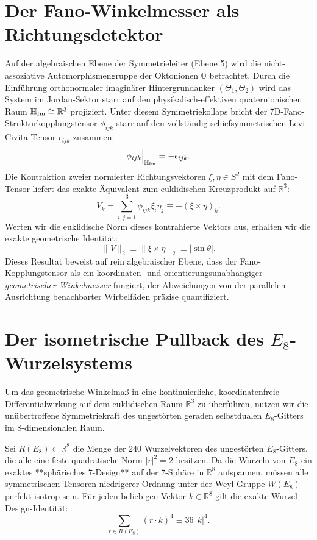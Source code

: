 \documentclass[11pt,twoside,a4paper]{article}
\begin{document}
	\section{Der Fano-Winkelmesser als Richtungsdetektor}
	Auf der algebraischen Ebene der Symmetrieleiter (Ebene 5) wird die nicht-assoziative Automorphismengruppe der Oktonionen $\mathbb{O}$ betrachtet. Durch die Einführung orthonormaler imaginärer Hintergrundanker $(\Theta_1, \Theta_2)$ wird das System im Jordan-Sektor starr auf den physikalisch-effektiven quaternionischen Raum $\mathbb{H}_{\rm Im} \cong \mathbb{R}^3$ projiziert. Unter diesem Symmetriekollaps bricht der 7D-Fano-Strukturkopplungstensor $\phi_{ijk}$ starr auf den vollständig schiefsymmetrischen Levi-Civita-Tensor $\epsilon_{ijk}$ zusammen:
	\begin{equation}
		\phi_{ijk}\Big|_{\mathbb{H}_{\rm Im}} = -\epsilon_{ijk}.
	\end{equation}
	Die Kontraktion zweier normierter Richtungsvektoren $\xi, \eta \in S^2$ mit dem Fano-Tensor liefert das exakte Äquivalent zum euklidischen Kreuzprodukt auf $\mathbb{R}^3$:
	\begin{equation}
		V_k = \sum_{i,j=1}^3 \phi_{ijk} \xi_i \eta_j \equiv -(\xi \times \eta)_k.
	\end{equation}
	Werten wir die euklidische Norm dieses kontrahierte Vektors aus, erhalten wir die exakte geometrische Identität:
	\begin{equation}
		\|V\|_2 \equiv \|\xi \times \eta\|_2 \equiv |\sin \theta|.
	\end{equation}
	Dieses Resultat beweist auf rein algebraischer Ebene, dass der Fano-Kopplungstensor als ein koordinaten- und orientierungsunabhängiger \textit{geometrischer Winkelmesser} fungiert, der Abweichungen von der parallelen Ausrichtung benachbarter Wirbelfäden präzise quantifiziert.
	
	\section{Der isometrische Pullback des $E_8$-Wurzelsystems}
	Um das geometrische Winkelmaß in eine kontinuierliche, koordinatenfreie Differentialwirkung auf dem euklidischen Raum $\mathbb{R}^3$ zu überführen, nutzen wir die unübertroffene Symmetriekraft des ungestörten geraden selbstdualen $E_8$-Gitters im 8-dimensionalen Raum.
	
	Sei $R(E_8) \subset \mathbb{R}^8$ die Menge der $240$ Wurzelvektoren des ungestörten $E_8$-Gitters, die alle eine feste quadratische Norm $|r|^2 = 2$ besitzen. Da die Wurzeln von $E_8$ ein exaktes **sphärisches 7-Design** auf der 7-Sphäre in $\mathbb{R}^8$ aufspannen, müssen alle symmetrischen Tensoren niedrigerer Ordnung unter der Weyl-Gruppe $W(E_8)$ perfekt isotrop sein. Für jeden beliebigen Vektor $k \in \mathbb{R}^8$ gilt die exakte Wurzel-Design-Identität:
	\begin{equation}
		\sum_{r \in R(E_8)} (r \cdot k)^4 \equiv 36 \, |k|^4.
	\end{equation}
	
\end{document}
